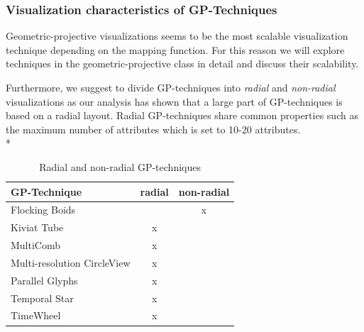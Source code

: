 \subsubsection{Visualization characteristics of GP-Techniques} \label{GP-Techniques}
Geometric-projective visualizations seems to be the most scalable visualization technique depending on the mapping function. For this reason we will explore techniques in the geometric-projective class in detail and discuss their scalability.


Furthermore, we suggest to divide GP-techniques into \textit{radial} and \textit{non-radial} visualizations\cite{Diehl2010} as our  analysis has shown that a large part of GP-techniques is based on a radial layout. Radial GP-techniques share common properties such as the maximum number of attributes which is set to 10-20 attributes\cite{Diehl2010}.\\*


\begin{table}[H]
	\centering
	\caption[Radial and non-radial GP-techniques]{Radial and non-radial GP-techniques}
	\label{radialTable}
	\begin{tabu}{lcc}
	\toprule
	GP-Technique & radial & non-radial \\
	\midrule
	Flocking Boids &  & x \\
	Kiviat Tube & x &  \\
	MultiComb & x &  \\
	Multi-resolution CircleView & x &  \\
	Parallel Glyphs & x &  \\
    Temporal Star & x &  \\
	TimeWheel & x & \\
	\bottomrule
	\end{tabu}
\end{table}

